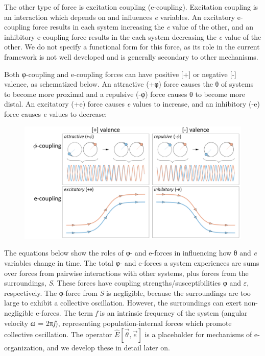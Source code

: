   The other type of force is excitation coupling (e-coupling). Excitation coupling is an interaction which depends on and influences \textit{e} variables. An excitatory e-coupling force results in each system increasing the \textit{e} value of the other, and an inhibitory e-coupling force results in the each system decreasing the \textit{e} value of the other. We do not specify a functional form for this force, as its role in the current framework is not well developed and is generally secondary to other mechanisms.

  Both φ-coupling and e-coupling forces can have positive [+] or negative [-] valence, as schematized below. An attractive (+φ) force causes the θ of systems to become more proximal and a repulsive (-φ) force causes θ to become more distal. An excitatory (+e) force causes \textit{e} values to increase, and an inhibitory (-e) force causes \textit{e} values to decrease: 

  
\begin{figure}
\includegraphics[width=\textwidth]{figures/Tilsen-img20.png}
\caption{\missingcaption}
\label{fig:}
\end{figure}
 

  The equations below show the roles of φ- and e-forces in influencing how θ and \textit{e} variables change in time. The total φ- and e-forces a system experiences are sums over forces from pairwise interactions with other systems, plus forces from the surroundings, \textit{S}. These forces have coupling strengths/susceptibilities φ and $\varepsilon $, respectively. The φ-force from \textit{S} is negligible, because the surroundings are too large to exhibit a collective oscillation. However, the surroundings can exert non-negligible e-forces. The term \textit{f} is an intrinsic frequency of the system (angular velocity \textit{ω} = 2π\textit{f}), representing population-internal forces which promote collective oscillation. The operator  $\widehat {{E}}\left[\overrightarrow{{\theta} },\overrightarrow{{e}}\right]$ is a placeholder for mechanisms of e-organization, and we develop these in detail later on.

